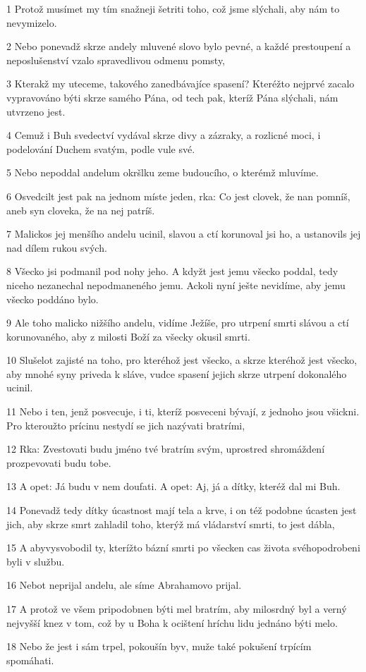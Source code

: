 \par 1 Protož musímet my tím snažneji šetriti toho, což jsme slýchali, aby nám to nevymizelo.
\par 2 Nebo ponevadž skrze andely mluvené slovo bylo pevné, a každé prestoupení a neposlušenství vzalo spravedlivou odmenu pomsty,
\par 3 Kterakž my uteceme, takového zanedbávajíce spasení? Kteréžto nejprvé zacalo vypravováno býti skrze samého Pána, od tech pak, kteríž Pána slýchali, nám utvrzeno jest.
\par 4 Cemuž i Buh svedectví vydával skrze divy a zázraky, a rozlicné moci, i podelování Duchem svatým, podle vule své.
\par 5 Nebo nepoddal andelum okršlku zeme budoucího, o kterémž mluvíme.
\par 6 Osvedcilt jest pak na jednom míste jeden, rka: Co jest clovek, že nan pomníš, aneb syn cloveka, že na nej patríš.
\par 7 Malickos jej menšího andelu ucinil, slavou a ctí korunoval jsi ho, a ustanovils jej nad dílem rukou svých.
\par 8 Všecko jsi podmanil pod nohy jeho. A kdyžt jest jemu všecko poddal, tedy niceho nezanechal nepodmaneného jemu. Ackoli nyní ješte nevidíme, aby jemu všecko poddáno bylo.
\par 9 Ale toho malicko nižšího andelu, vidíme Ježíše, pro utrpení smrti slávou a ctí korunovaného, aby z milosti Boží za všecky okusil smrti.
\par 10 Slušelot zajisté na toho, pro kteréhož jest všecko, a skrze kteréhož jest všecko, aby mnohé syny priveda k sláve, vudce spasení jejich skrze utrpení dokonalého ucinil.
\par 11 Nebo i ten, jenž posvecuje, i ti, kteríž posveceni bývají, z jednoho jsou všickni. Pro kteroužto prícinu nestydí se jich nazývati bratrími,
\par 12 Rka: Zvestovati budu jméno tvé bratrím svým, uprostred shromáždení prozpevovati budu tobe.
\par 13 A opet: Já budu v nem doufati. A opet: Aj, já a dítky, kteréž dal mi Buh.
\par 14 Ponevadž tedy dítky úcastnost mají tela a krve, i on též podobne úcasten jest jich, aby skrze smrt zahladil toho, kterýž má vládarství smrti, to jest dábla,
\par 15 A abyvysvobodil ty, kterížto bázní smrti po všecken cas života svéhopodrobeni byli v službu.
\par 16 Nebot neprijal andelu, ale síme Abrahamovo prijal.
\par 17 A protož ve všem pripodobnen býti mel bratrím, aby milosrdný byl a verný nejvyšší knez v tom, což by u Boha k ocištení hríchu lidu jednáno býti melo.
\par 18 Nebo že jest i sám trpel, pokoušín byv, muže také pokušení trpícím spomáhati.


